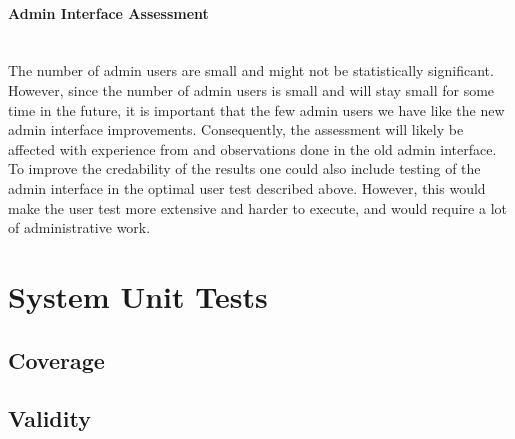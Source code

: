 \paragraph*{Admin Interface Assessment} \hfill \\
The number of admin users are small and might not be statistically significant. However, since the number of admin users is small and will stay small for some time in the future, it is important that the few admin users we have like the new admin interface improvements. Consequently, the assessment will likely be affected with experience from and observations done in the old admin interface. To improve the credability of the results one could also include testing of the admin interface in the optimal user test described above. However, this would make the user test more extensive and harder to execute, and would require a lot of administrative work.

\section{System Unit Tests}

\subsection{Coverage}

\subsection{Validity}
